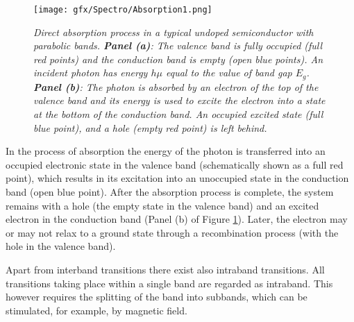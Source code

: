 \documentclass[titlepage,a4paper]{book}
\begin{document}
\begin{figure}[ht]
	\centering
	\texttt{[image: gfx/Spectro/Absorption1.png]}
	\vspace{-10pt}
	\caption{\textit{Direct absorption process in a typical undoped semiconductor with parabolic bands. \textbf{Panel (a)}: The valence band is fully occupied (full red points) and the conduction band is empty (open blue points). An incident photon has energy $h\mu$ equal to the value of band gap $E_g$. \textbf{Panel (b)}: The photon is absorbed by an electron of the top of the valence band and its energy is used to excite the electron into a state at the bottom of the conduction band. An occupied excited state (full blue point), and a hole (empty red point) is left behind.}}
	\label{fig:Absorption1}
\end{figure} 

In the process of absorption the energy of the photon is transferred into an occupied electronic state in the valence band (schematically shown as a full red point), which results in its excitation into an unoccupied state in the conduction band (open blue point). After the absorption process is complete, the system remains with a hole (the empty state in the valence band) and an excited electron in the conduction band (Panel (b) of Figure \ref{fig:Absorption1}). Later, the electron may or may not relax to a ground state through a recombination process (with the hole in the valence band).

Apart from interband transitions there exist also intraband transitions. All transitions taking place within a single band are regarded as intraband. This however requires the splitting of the band into subbands, which can be stimulated, for example, by magnetic field.
\end{document}
